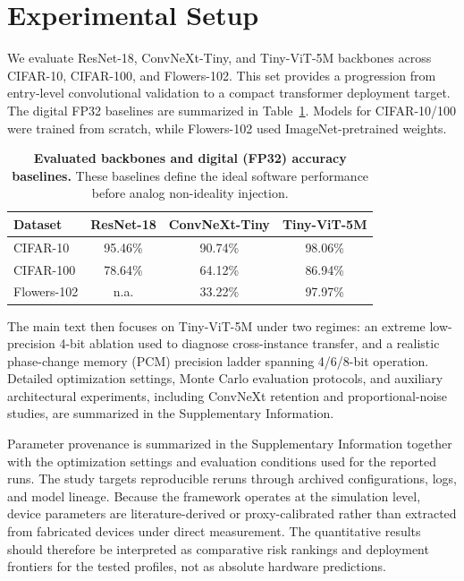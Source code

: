 \section{Experimental Setup}
\label{sec:experimental-setup}

We evaluate ResNet-18, ConvNeXt-Tiny, and Tiny-ViT-5M backbones across CIFAR-10, CIFAR-100, and Flowers-102. This set provides a progression from entry-level convolutional validation to a compact transformer deployment target. The digital FP32 baselines are summarized in Table~\ref{tab:digital_baselines}. Models for CIFAR-10/100 were trained from scratch, while Flowers-102 used ImageNet-pretrained weights.

\begin{table}[htbp]
\centering
\caption{\textbf{Evaluated backbones and digital (FP32) accuracy baselines.} These baselines define the ideal software performance before analog non-ideality injection.}
\label{tab:digital_baselines}
\begin{tabular}{lccc}
\toprule
\textbf{Dataset} & \textbf{ResNet-18} & \textbf{ConvNeXt-Tiny} & \textbf{Tiny-ViT-5M} \\
\midrule
CIFAR-10 & 95.46\% & 90.74\% & 98.06\% \\
CIFAR-100 & 78.64\% & 64.12\% & 86.94\% \\
Flowers-102 & n.a. & 33.22\% & 97.97\% \\
\bottomrule
\end{tabular}
\end{table}

The main text then focuses on Tiny-ViT-5M under two regimes: an extreme low-precision 4-bit ablation used to diagnose cross-instance transfer, and a realistic phase-change memory (PCM) precision ladder spanning 4/6/8-bit operation. Detailed optimization settings, Monte Carlo evaluation protocols, and auxiliary architectural experiments, including ConvNeXt retention and proportional-noise studies, are summarized in the Supplementary Information.

Parameter provenance is summarized in the Supplementary Information together with the optimization settings and evaluation conditions used for the reported runs. The study targets reproducible reruns through archived configurations, logs, and model lineage. Because the framework operates at the simulation level, device parameters are literature-derived or proxy-calibrated rather than extracted from fabricated devices under direct measurement. The quantitative results should therefore be interpreted as comparative risk rankings and deployment frontiers for the tested profiles, not as absolute hardware predictions.

